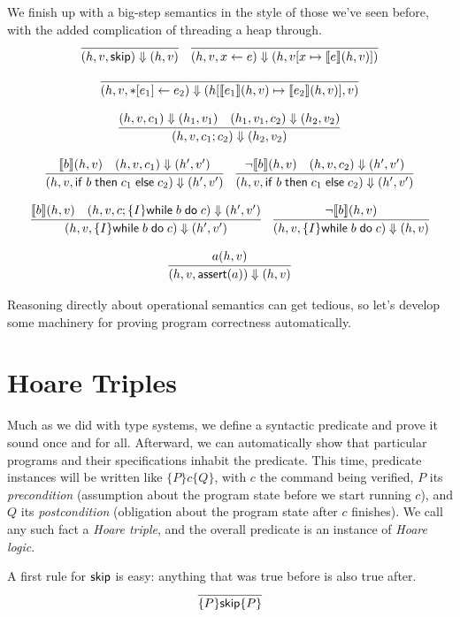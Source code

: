 \documentclass{amsbook}
\theoremstyle{definition}
\theoremstyle{remark}
\numberwithin{section}{chapter}
\numberwithin{equation}{chapter}
\begin{document}
We finish up with a big-step semantics in the style of those we've seen before, with the added complication of threading a heap through.
\encoding
$$\infer{\bigstep{(h, v, \skipe)}{(h, v)}}{}
\quad \infer{\bigstep{(h, v, \assign{x}{e})}{(h, \mupd{v}{x}{\denote{e}(h, v)})}}{}$$

$$\infer{\bigstep{(h, v, \writeto{e_1}{e_2})}{(\mupd{h}{\denote{e_1}(h, v)}{\denote{e_2}(h, v)}, v)}}{}$$

$$\infer{\bigstep{(h, v, c_1; c_2)}{(h_2, v_2)}}{
  \bigstep{(h, v, c_1)}{(h_1, v_1)}
  & \bigstep{(h_1, v_1, c_2)}{(h_2, v_2)}
}$$

$$\infer{\bigstep{(h, v, \ifte{b}{c_1}{c_2})}{(h', v')}}{
  \denote{b}(h, v)
  & \bigstep{(h, v, c_1)}{(h', v')}
}
\quad \infer{\bigstep{(h, v, \ifte{b}{c_1}{c_2})}{(h', v')}}{
  \neg \denote{b}(h, v)
  & \bigstep{(h, v, c_2)}{(h', v')}
}$$

$$\infer{\bigstep{(h, v, \{I\} \while{b}{c})}{(h', v')}}{
  \denote{b}(h, v)
  & \bigstep{(h, v, c; \{I\} \while{b}{c})}{(h', v')}
}
\quad \infer{\bigstep{(h, v, \{I\} \while{b}{c})}{(h, v)}}{
  \neg \denote{b}(h, v)
}$$

$$\infer{\bigstep{(h, v, \assert{a})}{(h, v)}}{
  a(h, v)
}$$

Reasoning directly about operational semantics can get tedious, so let's develop some machinery for proving program correctness automatically.


\section{Hoare Triples}

\newcommand{\hoare}[3]{\{#1\} #2 \{#3\}}

Much as we did with type systems, we define a syntactic predicate and prove it sound once and for all.
Afterward, we can automatically show that particular programs and their specifications inhabit the predicate.
This time, predicate instances will be written like $\hoare{P}{c}{Q}$, with $c$ the command being verified, $P$ its \emph{precondition} (assumption about the program state before we start running $c$), and $Q$ its \emph{postcondition} (obligation about the program state after $c$ finishes).
We call any such fact a \emph{Hoare triple}, and the overall predicate is an instance of \emph{Hoare logic}.

\encoding
A first rule for $\mathsf{skip}$ is easy: anything that was true before is also true after.
$$\infer{\hoare{P}{\skipe}{P}}{}$$
\end{document}
